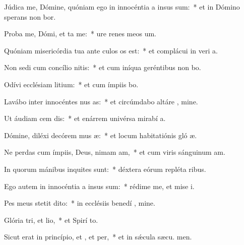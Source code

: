 \item Júdica me, Dómine, quóniam ego in innocéntia a insus sum:~* et in Dómino sperans non bor.
\item Proba me, Dómi, et ta me:~* ure renes meos   um.
\item Quóniam misericórdia tua ante culos os est:~* et complácui in veri a.
\item Non sedi cum concílio nitis:~* et cum iníqua geréntibus non bo.
\item Odívi ecclésiam litium:~* et cum ímpiis  bo.
\item Lavábo inter innocéntes nus as:~* et circúmdabo altáre , mine.
\item Ut áudiam cem dis:~* et enárrem univérsa mirabí a.
\item Dómine, diléxi decórem mus æ:~* et locum habitatiónis gló æ.
\item Ne perdas cum ímpiis, Deus, nimam am,~* et cum viris sánguinum  am.
\item In quorum mánibus inquites sunt:~* déxtera eórum repléta  ribus.
\item Ego autem in innocéntia a insus sum:~* rédime me, et mise i.
\item Pes meus stetit  dito:~* in ecclésiis benedí , mine.
\item Glória tri, et lio,~* et Spirí to.
\item Sicut erat in princípio, et , et per,~* et in sǽcula sæcu. men.
